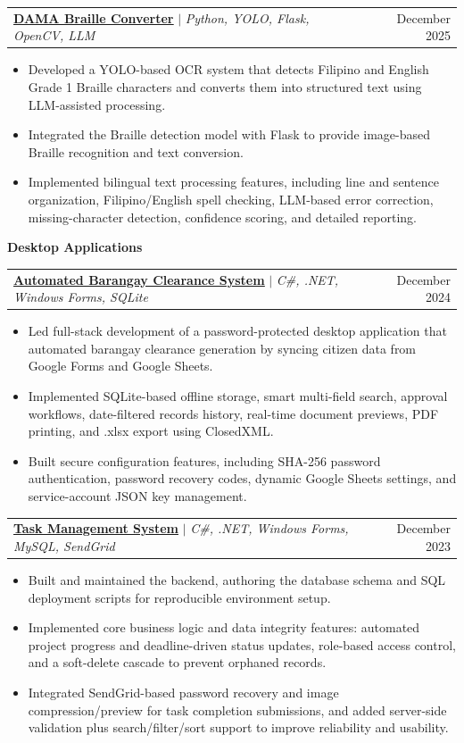 \documentclass[letterpaper,11pt]{article}
\makeatletter
\newcommand{\resumeItem}[1]{
  \item\small{
    {#1 \vspace{-2pt}}
  }
}
\newcommand{\resumeProjectHeading}[2]{
    \item
    \begin{tabular*}{0.97\textwidth}{l@{\extracolsep{\fill}}r}
      \small#1 & #2 \\
    \end{tabular*}\vspace{-7pt}
}
\newcommand{\resumeItemListStart}{\begin{itemize}}
\newcommand{\resumeItemListEnd}{\end{itemize}\vspace{-5pt}}
\let\oldProjectHeading\resumeProjectHeading
\renewcommand{\resumeProjectHeading}[2]{\needspace{4\baselineskip}\oldProjectHeading{#1}{#2}}
\newcommand{\resumeGroup}[1]{\item[]\hspace{-0.15in}\textbf{\small #1}\vspace{-4pt}}
\makeatother
\begin{document}
      \resumeProjectHeading
        {\textbf{\href{https://github.com/khat001/DAMA-Filipino-Braille-Converter}{\underline{DAMA Braille Converter}}} $|$
        \emph{Python, YOLO, Flask, OpenCV, LLM}}
        {December 2025}
          \resumeItemListStart
            \resumeItem{Developed a YOLO-based OCR system that detects Filipino and English Grade 1 Braille characters and converts them into structured text using LLM-assisted processing.}
            \resumeItem{Integrated the Braille detection model with Flask to provide image-based Braille recognition and text conversion.}
            \resumeItem{Implemented bilingual text processing features, including line and sentence organization, Filipino/English spell checking, LLM-based error correction, missing-character detection, confidence scoring, and detailed reporting.}
          \resumeItemListEnd

      \resumeGroup{Desktop Applications}

      \resumeProjectHeading
        {\textbf{\href{https://github.com/Shibarashii/automated-barangay-clearance-system}{\underline{Automated Barangay Clearance System}}} $|$
        \emph{C\#, .NET, Windows Forms, SQLite}}
        {December 2024}
          \resumeItemListStart
            \resumeItem{Led full-stack development of a password-protected desktop application that automated barangay clearance generation by syncing citizen data from Google Forms and Google Sheets.}
            \resumeItem{Implemented SQLite-based offline storage, smart multi-field search, approval workflows, date-filtered records history, real-time document previews, PDF printing, and .xlsx export using ClosedXML.}
            \resumeItem{Built secure configuration features, including SHA-256 password authentication, password recovery codes, dynamic Google Sheets settings, and service-account JSON key management.}
          \resumeItemListEnd

      \resumeProjectHeading
        {\textbf{\href{https://github.com/Shibarashii/task-management-system}{\underline{Task Management System}}} $|$
        \emph{C\#, .NET, Windows Forms, MySQL, SendGrid}}
        {December 2023}
          \resumeItemListStart
            \resumeItem{Built and maintained the backend, authoring the database schema and SQL deployment scripts for reproducible environment setup.}
            \resumeItem{Implemented core business logic and data integrity features: automated project progress and deadline-driven status updates, role-based access control, and a soft-delete cascade to prevent orphaned records.}
            \resumeItem{Integrated SendGrid-based password recovery and image compression/preview for task completion submissions, and added server-side validation plus search/filter/sort support to improve reliability and usability.}
          \resumeItemListEnd
\end{document}
